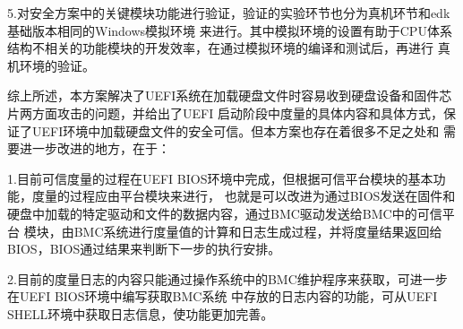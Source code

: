 \begin{APP}
\par 5.对安全方案中的关键模块功能进行验证，验证的实验环节也分为真机环节和edk基础版本相同的Windows模拟环境
来进行。其中模拟环境的设置有助于CPU体系结构不相关的功能模块的开发效率，在通过模拟环境的编译和测试后，再进行
真机环境的验证。
\par 综上所述，本方案解决了UEFI系统在加载硬盘文件时容易收到硬盘设备和固件芯片两方面攻击的问题，并给出了UEFI
启动阶段中度量的具体内容和具体方式，保证了UEFI环境中加载硬盘文件的安全可信。但本方案也存在着很多不足之处和
需要进一步改进的地方，在于：
\par 1.目前可信度量的过程在UEFI BIOS环境中完成，但根据可信平台模块的基本功能，度量的过程应由平台模块来进行，
也就是可以改进为通过BIOS发送在固件和硬盘中加载的特定驱动和文件的数据内容，通过BMC驱动发送给BMC中的可信平台
模块，由BMC系统进行度量值的计算和日志生成过程，并将度量结果返回给BIOS，BIOS通过结果来判断下一步的执行安排。
\par 2.目前的度量日志的内容只能通过操作系统中的BMC维护程序来获取，可进一步在UEFI BIOS环境中编写获取BMC系统
中存放的日志内容的功能，可从UEFI SHELL环境中获取日志信息，使功能更加完善。

\end{APP}

\bjutclearpage